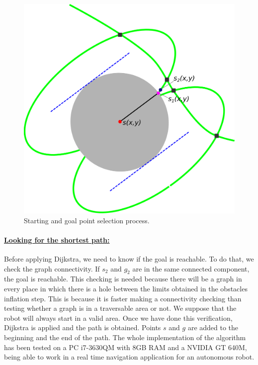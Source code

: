 \begin{figure}[h!]
  \centering
  \includegraphics[width=\textwidth, trim=0 0 0 0,clip]{figure6}
  \caption{Starting and goal point selection process.}
  \label{fig:cp06_findstartgoal}
\end{figure}

\paragraph{\underline{Looking for the shortest path:}}\label{ch:chapter06_01_02_04_02}

Before applying Dijkstra, we need to know if the goal is reachable. To do that, we check the graph connectivity. If $s_2$ and $g_2$ are in the same connected component, the goal is reachable. This checking is needed because there will be a graph in every place in which there is a hole between the limits obtained in the obstacles inflation step. This is because it is faster making a connectivity checking than testing whether a graph is in a traversable area or not. We suppose that the robot will always start in a valid area.
Once we have done this verification, Dijkstra is applied and the path is obtained. Points $s$ and $g$ are added to the beginning and the end of the path. The whole implementation of the algorithm has been tested on a PC i7-3630QM with 8GB RAM and a NVIDIA GT 640M, being able to work in a real time navigation application for an autonomous robot.

